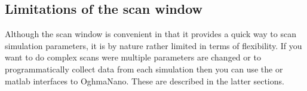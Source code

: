 \subsection{Limitations of the scan window}
Although the scan window is convenient in that it provides a quick way to scan simulation parameters, it is by nature rather limited in terms of flexibility. If you want to do complex scans were multiple parameters are changed or to programmatically collect data from each simulation then you can use the  or matlab interfaces to OghmaNano.  These are described in the latter sections.
\vfill
